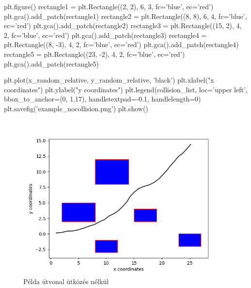 \begin{python}
plt.figure()
rectangle1 = plt.Rectangle((2, 2), 6, 3, fc='blue', ec='red')
plt.gca().add_patch(rectangle1)
rectangle2 = plt.Rectangle((8, 8), 6, 4, fc='blue', ec='red')
plt.gca().add_patch(rectangle2)
rectangle3 = plt.Rectangle((15, 2), 4, 2, fc='blue', ec='red')
plt.gca().add_patch(rectangle3)
rectangle4 = plt.Rectangle((8, -3), 4, 2, fc='blue', ec='red')
plt.gca().add_patch(rectangle4)
rectangle5 = plt.Rectangle((23, -2), 4, 2, fc='blue', ec='red')
plt.gca().add_patch(rectangle5)

plt.plot(x_random_relative, y_random_relative, 'black')
plt.xlabel("x coordinates")
plt.ylabel("y coordinates")
plt.legend(collision_list, loc='upper left', bbox_to_anchor=(0, 1.17),
handletextpad=-0.1, handlelength=0)
plt.savefig('example_nocollision.png')
plt.show()
\end{python}


\begin{figure}[h!]
\centering
\includegraphics[scale=0.75]{images/example_nocollision.png}
\caption{Példa útvonal ütközés nélkül}
\label{fig:example_nocollision}
\end{figure}



